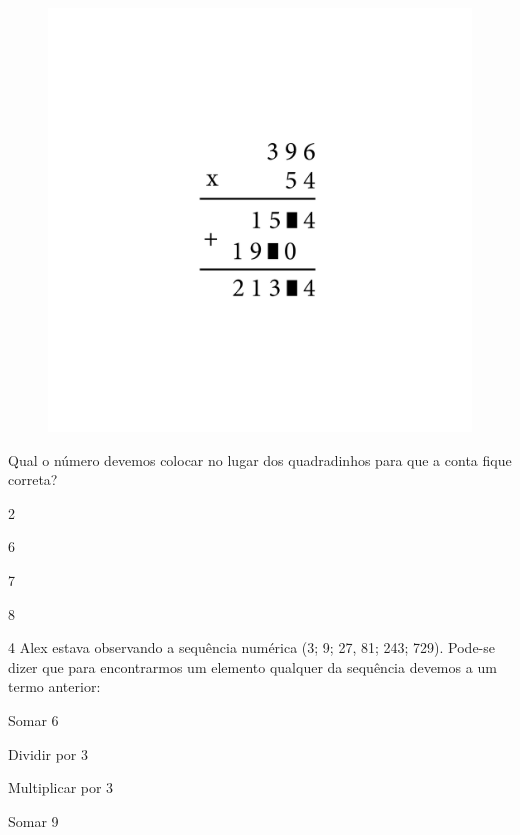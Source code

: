 \begin{figure}[htpb!]
\includegraphics[width=\textwidth]{../ilustracoes/MAT5/SAEB_5ANO_MAT_figura121.png}
\end{figure}

Qual o número devemos colocar no lugar dos quadradinhos para que a conta
fique correta?

\begin{escolha}
\item
  2
\item
  6
\item
  7
\item
  8
\end{escolha}


\num{4} Alex estava observando a sequência numérica (3; 9; 27, 81; 243;
729). Pode-se dizer que para encontrarmos um elemento qualquer da
sequência devemos a um termo anterior:

\begin{escolha}
\item
  Somar 6
\item
  Dividir por 3
\item
  Multiplicar por 3
\item
  Somar 9
\end{escolha}

